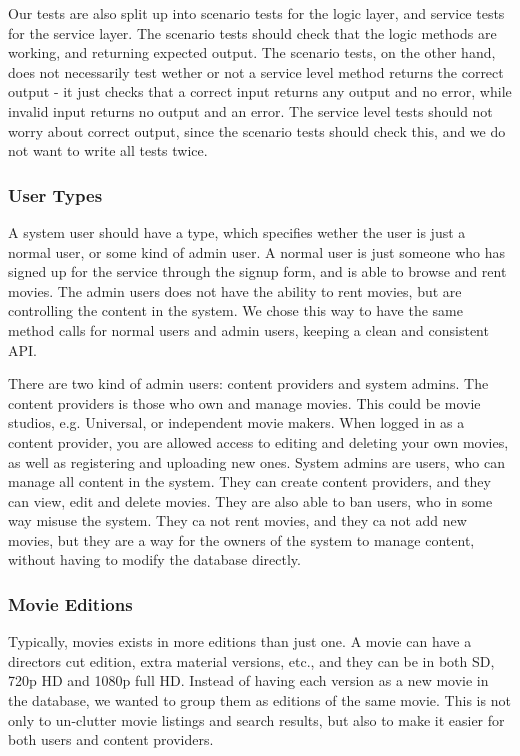 Our tests are also split up into scenario tests for the logic layer, and service tests for the service layer. The scenario tests should check that the logic methods are working, and returning expected output. The scenario tests, on the other hand, does not necessarily test wether or not a service level method returns the correct output - it just checks that a correct input returns any output and no error, while invalid input returns no output and an error. The service level tests should not worry about correct output, since the scenario tests should check this, and we do not want to write all tests twice.

\subsubsection{User Types}
\label{Design_Service_Analysis_UserTypes}
A system user should have a type, which specifies wether the user is just a normal user, or some kind of admin user. A normal user is just someone who has signed up for the service through the signup form, and is able to browse and rent movies. The admin users does not have the ability to rent movies, but are controlling the content in the system. We chose this way to have the same method calls for normal users and admin users, keeping a clean and consistent API. 

There are two kind of admin users: content providers and system admins. The content providers is those who own and manage movies. This could be movie studios, e.g. Universal, or independent movie makers. When logged in as a content provider, you are allowed access to editing and deleting your own movies, as well as registering and uploading new ones. System admins are users, who can manage all content in the system. They can create content providers, and they can view, edit and delete movies. They are also able to ban users, who in some way misuse the system. They ca not rent movies, and they ca not add new movies, but they are a way for the owners of the system to manage content, without having to modify the database directly.

\subsubsection{Movie Editions}
\label{Design_Service_Analysis_MovieEditions}
Typically, movies exists in more editions than just one. A movie can have a directors cut edition, extra material versions, etc., and they can be in both SD, 720p HD and 1080p full HD. Instead of having each version as a new movie in the database, we wanted to group them as editions of the same movie. This is not only to un-clutter movie listings and search results, but also to make it easier for both users and content providers.

